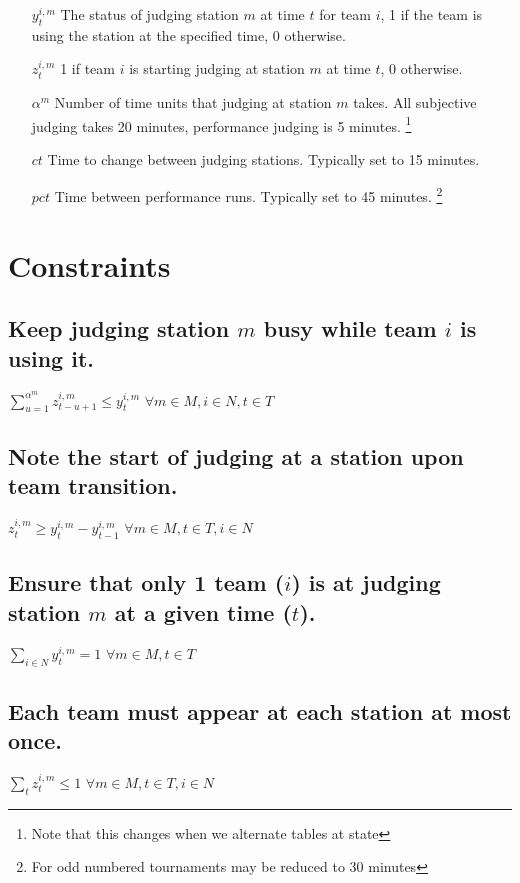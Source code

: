 \documentclass[letterpaper,11pt]{report}
\newcommand{\doccomment}[3]%
{\marginpar{\textcolor{#2}{\bf #1}}%
\footnote{{\color{#2}#3}}%
}
\newcommand{\doccomment}[3]{}
\newcommand{\jpscomment}[1]%
{\doccomment{SCHEWE}{Bittersweet}{#1}}
\begin{document}
\begin{itemize}
\item[$y_{t}^{i,m}$] The status of judging station $m$ at time $t$ for team
  $i$, 1 if the team is using the station at the specified time, 0 otherwise.

\item[$z_{t}^{i,m}$] 1 if team $i$ is starting judging at station $m$ at
  time $t$, 0 otherwise.
 
\item[$\alpha^{m}$] Number of time units that judging at station $m$
  takes. All subjective judging takes 20 minutes, performance judging is 5
  minutes. \jpscomment{Note that this changes when we alternate tables at state}

\item[$ct$] Time to change between judging stations. Typically set to 15
  minutes.
\item[$pct$] Time between performance runs. Typically set to 45
  minutes. \jpscomment{For odd numbered tournaments may be reduced to 30
    minutes}


\end{itemize}

\section{Constraints}

\subsection{Keep judging station $m$ busy while team $i$ is using it.}
$\sum\limits_{u=1}^{\alpha^{m}} z_{t-u+1}^{i,m} \le y_{t}^{i,m}$
\hfill $\forall m \in M, i \in N, t \in T$

\subsection{Note the start of judging at a station upon team transition.}
$z_{t}^{i,m} \ge y_{t}^{i,m} - y_{t-1}^{i,m}$
\hfill $\forall m \in M, t \in T, i \in N$

\subsection{Ensure that only 1 team ($i$) is at judging station $m$ at a given time
($t$).}
$\sum\limits_{i \in N} y_{t}^{i,m} = 1$          
\hfill $\forall m \in M, t \in T$

\subsection{Each team must appear at each station at most once.}
$\sum\limits_{t} z_{t}^{i,m} \le 1$
\hfill $\forall m \in M, t \in T, i \in N$
\end{document}
